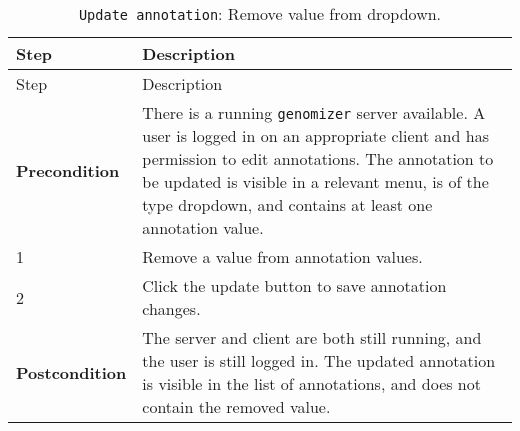 \begin{longtable}[c]{@{}ll@{}}
\caption{\texttt{Update\ annotation}: Remove value from
dropdown.}\tabularnewline
\toprule
\begin{minipage}[b]{0.31\columnwidth}\raggedright\strut
Step
\strut\end{minipage} &
\begin{minipage}[b]{0.63\columnwidth}\raggedright\strut
Description
\strut\end{minipage}\tabularnewline
\midrule
\endfirsthead
\toprule
\begin{minipage}[b]{0.31\columnwidth}\raggedright\strut
Step
\strut\end{minipage} &
\begin{minipage}[b]{0.63\columnwidth}\raggedright\strut
Description
\strut\end{minipage}\tabularnewline
\midrule
\endhead
\begin{minipage}[t]{0.31\columnwidth}\raggedright\strut
\textbf{Precondition}
\strut\end{minipage} &
\begin{minipage}[t]{0.63\columnwidth}\raggedright\strut
There is a running \texttt{genomizer} server available. A user is logged
in on an appropriate client and has permission to edit annotations. The
annotation to be updated is visible in a relevant menu, is of the type
dropdown, and contains at least one annotation value.
\strut\end{minipage}\tabularnewline
\begin{minipage}[t]{0.31\columnwidth}\raggedright\strut
1
\strut\end{minipage} &
\begin{minipage}[t]{0.63\columnwidth}\raggedright\strut
Remove a value from annotation values.
\strut\end{minipage}\tabularnewline
\begin{minipage}[t]{0.31\columnwidth}\raggedright\strut
2
\strut\end{minipage} &
\begin{minipage}[t]{0.63\columnwidth}\raggedright\strut
Click the update button to save annotation changes.
\strut\end{minipage}\tabularnewline
\begin{minipage}[t]{0.31\columnwidth}\raggedright\strut
\textbf{Postcondition}
\strut\end{minipage} &
\begin{minipage}[t]{0.63\columnwidth}\raggedright\strut
The server and client are both still running, and the user is still
logged in. The updated annotation is visible in the list of annotations,
and does not contain the removed value.
\strut\end{minipage}\tabularnewline
\bottomrule
\end{longtable}

